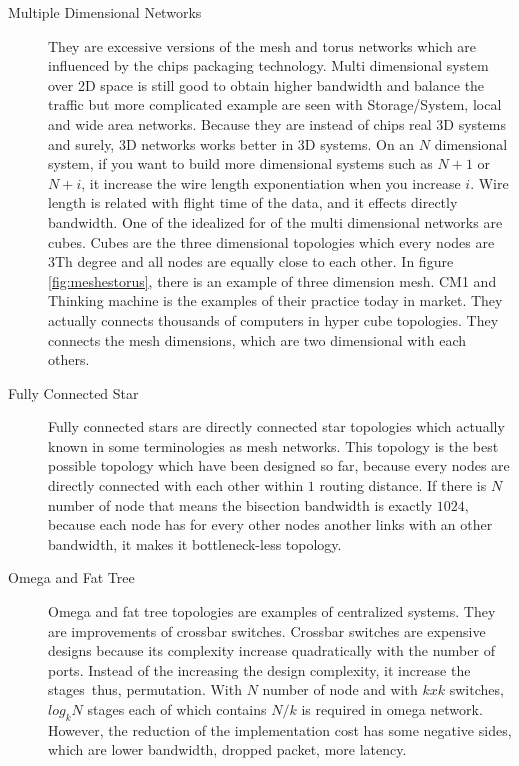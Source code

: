\begin{description}
            \item[Multiple Dimensional Networks] They are excessive versions of the mesh and torus networks which are influenced by the chips packaging technology. Multi dimensional system over 2D space is still good to obtain higher bandwidth and balance the traffic but more complicated example are seen with Storage/System, local and wide area networks. Because they are instead of chips real 3D systems and surely, 3D networks works better in 3D systems. On an $N$ dimensional system, if you want to build more dimensional systems such as $N+1$ or $N+i$, it increase the wire length exponentiation when you increase $i$. Wire length is related with flight time of the data, and it effects directly bandwidth. One of the idealized for of the multi dimensional networks are cubes. Cubes are the three dimensional topologies which every nodes are 3Th degree and all nodes are equally close to each other. In figure \ref{fig:meshestorus}, there is an example of three dimension mesh. CM1 and Thinking machine is the examples of their practice today in market. They actually connects thousands of computers in hyper cube topologies. They connects the mesh dimensions, which are two dimensional with each others.
            \item[Fully Connected Star] Fully connected stars are directly connected star topologies which actually known in some terminologies as mesh networks. This topology is the best possible topology which have been designed so far, because every nodes are directly connected with each other within $1$ routing distance. If there is $N$ number of node that means the bisection bandwidth is exactly $1024$, because each node has for every other nodes another links with an other bandwidth, it makes it bottleneck-less topology.
            \item[Omega and Fat Tree] Omega and fat tree topologies are examples of centralized systems. They are improvements of crossbar switches. Crossbar switches are expensive designs because its complexity increase quadratically with the number of ports. Instead of the increasing the design complexity, it increase the stages\ thus, permutation\cite{hennessy2012computer}. With $N$ number of node and with $kxk$ switches, $log_{k}N$ stages each of which contains $N/k$ is required in omega network. However, the reduction of the implementation cost has some negative sides, which are lower bandwidth, dropped packet, more latency.
        \end{description}
